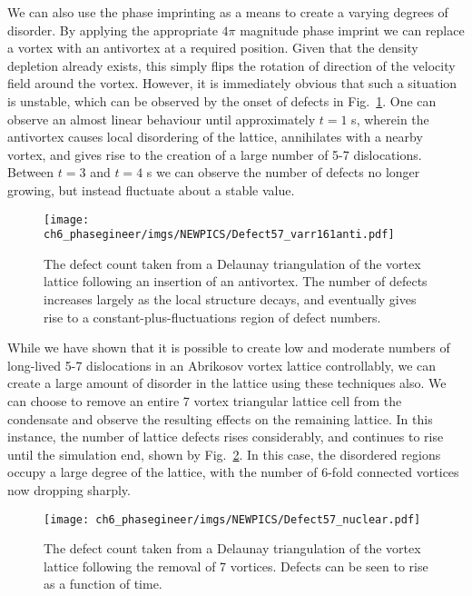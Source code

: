 We can also use the phase imprinting as a means to create a varying degrees of disorder. By applying the appropriate $4\pi$ magnitude phase imprint we can replace a vortex with an antivortex at a required position. Given that the density depletion already exists, this simply flips the rotation of direction of the velocity field around the vortex. However, it is immediately obvious that such a situation is unstable, which can be observed by the onset of defects in Fig.~\ref{fig:varr161anti_defect}. One can observe an almost linear behaviour until approximately $t=1$ s, wherein the antivortex causes local disordering of the lattice, annihilates with a nearby vortex, and gives rise to the creation of a large number of 5-7 dislocations. Between $t=3$ and $t=4$ s we can observe the number of defects no longer growing, but instead fluctuate about a stable value.

\begin{figure}[H] \centering
    \vspace{1cm}
    \texttt{[image: ch6\_phasegineer/imgs/NEWPICS/Defect57\_varr161anti.pdf]}
    \caption{The defect count taken from a Delaunay triangulation of the vortex lattice following an insertion of an antivortex. The number of defects increases largely as the local structure decays, and eventually gives rise to a constant-plus-fluctuations region of defect numbers.}\label{fig:varr161anti_defect}
\end{figure}

While we have shown that it is possible to create low and moderate numbers of long-lived 5-7 dislocations in an Abrikosov vortex lattice controllably, we can create a large amount of disorder in the lattice using these techniques also. We can choose to remove an entire 7 vortex triangular lattice cell from the condensate and observe the resulting effects on the remaining lattice. In this instance, the number of lattice defects rises considerably, and continues to rise until the simulation end, shown by Fig.~\ref{fig:remove7_defect}. In this case, the disordered regions occupy a large degree of the lattice, with the number of 6-fold connected vortices now dropping sharply.

\begin{figure}[H] \centering
    \texttt{[image: ch6\_phasegineer/imgs/NEWPICS/Defect57\_nuclear.pdf]}
    \caption{The defect count taken from a Delaunay triangulation of the vortex lattice following the removal of 7 vortices. Defects can be seen to rise as a function of time.}\label{fig:remove7_defect}
\end{figure}

